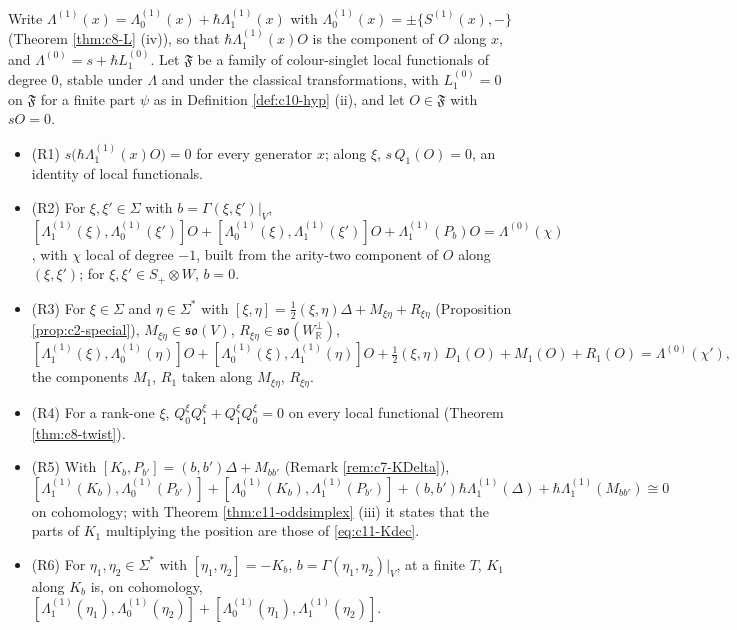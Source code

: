 \begin{proposition}
\label{prop:c11-relations}
Write $\Lambda^{(1)}(x)=\Lambda^{(1)}_0(x)+\hbar\Lambda^{(1)}_1(x)$ with $\Lambda^{(1)}_0(x)=\pm\{S^{(1)}(x),-\}$ (Theorem \ref{thm:c8-L} (iv)), so that $\hbar\Lambda^{(1)}_1(x)O$ is the component of $O$ along $x$, and $\Lambda^{(0)}=s+\hbar L_1^{(0)}$. Let $\mathfrak F$ be a family of colour-singlet local functionals of degree $0$, stable under $\Lambda$ and under the classical transformations, with $L_1^{(0)}=0$ on $\mathfrak F$ for a finite part $\psi$ as in Definition \ref{def:c10-hyp} (ii), and let $O\in\mathfrak F$ with $sO=0$.
\begin{itemize}
\item (R1) $s\big(\hbar\Lambda^{(1)}_1(x)O\big)=0$ for every generator $x$; along $\xi$, $s\,Q_1(O)=0$, an identity of local functionals.
\item (R2) For $\xi,\xi'\in\Sigma$ with $b=\Gamma(\xi,\xi')|_V$, $[\Lambda^{(1)}_1(\xi),\Lambda^{(1)}_0(\xi')]O+[\Lambda^{(1)}_0(\xi),\Lambda^{(1)}_1(\xi')]O+\Lambda^{(1)}_1(P_b)O=\Lambda^{(0)}(\chi)$, with $\chi$ local of degree $-1$, built from the arity-two component of $O$ along $(\xi,\xi')$; for $\xi,\xi'\in S_+\otimes W$, $b=0$.
\item (R3) For $\xi\in\Sigma$ and $\eta\in\Sigma^*$ with $[\xi,\eta]=\tfrac12(\xi,\eta)\Delta+M_{\xi\eta}+R_{\xi\eta}$ (Proposition \ref{prop:c2-special}), $M_{\xi\eta}\in\mathfrak{so}(V)$, $R_{\xi\eta}\in\mathfrak{so}(W_{\mathbb R}^\perp)$,
\[
[\Lambda^{(1)}_1(\xi),\Lambda^{(1)}_0(\eta)]O+[\Lambda^{(1)}_0(\xi),\Lambda^{(1)}_1(\eta)]O+\tfrac12(\xi,\eta)\,D_1(O)+M_1(O)+R_1(O)=\Lambda^{(0)}(\chi'),
\]
the components $M_1$, $R_1$ taken along $M_{\xi\eta}$, $R_{\xi\eta}$.
\item (R4) For a rank-one $\xi$, $Q^\xi_0Q^\xi_1+Q^\xi_1Q^\xi_0=0$ on every local functional (Theorem \ref{thm:c8-twist}).
\item (R5) With $[K_b,P_{b'}]=(b,b')\Delta+M_{bb'}$ (Remark \ref{rem:c7-KDelta}), $[\Lambda^{(1)}_1(K_b),\Lambda^{(1)}_0(P_{b'})]+[\Lambda^{(1)}_0(K_b),\Lambda^{(1)}_1(P_{b'})]+(b,b')\hbar\Lambda^{(1)}_1(\Delta)+\hbar\Lambda^{(1)}_1(M_{bb'})\cong0$ on cohomology; with Theorem \ref{thm:c11-oddsimplex} (iii) it states that the parts of $K_1$ multiplying the position are those of \eqref{eq:c11-Kdec}.
\item (R6) For $\eta_1,\eta_2\in\Sigma^*$ with $[\eta_1,\eta_2]=-K_b$, $b=\Gamma(\eta_1,\eta_2)|_V$, at a finite $T$, $K_1$ along $K_b$ is, on cohomology, $[\Lambda^{(1)}_1(\eta_1),\Lambda^{(1)}_0(\eta_2)]+[\Lambda^{(1)}_0(\eta_1),\Lambda^{(1)}_1(\eta_2)]$.

\end{itemize}
\end{proposition}

